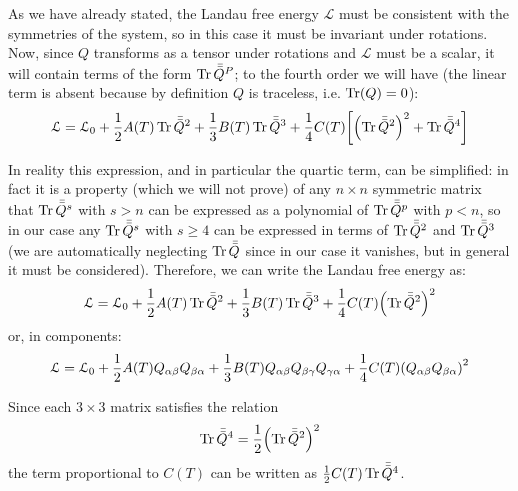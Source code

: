 \documentclass[../main/main.tex]{subfiles}
\begin{document}
As we have already stated, the Landau free energy \( \mathcal{L} \)  must be consistent with the symmetries of the system, so in this case it must be invariant under rotations. Now, since \( Q \) transforms as a tensor under rotations and \( \mathcal{L} \) must be a scalar, it will contain terms of the form  \( \Tr \bar{\bar{Q} }^P \); to the fourth order we will have (the linear term is absent because by definition \( Q \) is traceless, i.e. \( \Tr(Q) = 0  \)):
\begin{equation*}
  \mathcal{L} = \mathcal{L}_0 + \frac{1}{2} A(T) \Tr \bar{\bar{Q} }^2 + \frac{1}{3} B(T) \Tr \bar{\bar{Q} }^3 + \frac{1}{4} C(T) \qty[ \qty(\Tr \bar{\bar{Q} }^2  )^2 + \Tr \bar{\bar{Q} }^4 ]
\end{equation*}

In reality this expression, and in particular the quartic term, can be simplified: in fact it is a property (which we will not prove) of any \( n \times n \)  symmetric matrix that \( \Tr \bar{\bar{Q} }^s \) with \( s>n \)  can be expressed as a
 polynomial of \( \Tr \bar{\bar{Q} }^p \) with \( p<n \), so in our case any \( \Tr \bar{\bar{Q} }^s \) with \( s\geq 4 \) can be expressed in terms of \( \Tr \bar{\bar{Q} }^2 \) and \( \Tr \bar{\bar{Q} }^3 \) (we are automatically neglecting  \( \Tr \bar{\bar{Q} } \)  since in our case it vanishes, but in general it must be considered).
 Therefore, we can write the Landau free energy as:
 \begin{equation}
   \mathcal{L} = \mathcal{L}_0 + \frac{1}{2} A(T) \Tr \bar{\bar{Q} }^2 + \frac{1}{3} B(T) \Tr \bar{\bar{Q} }^3 + \frac{1}{4} C(T)  \qty(\Tr \bar{\bar{Q} }^2  )^2
 \end{equation}
or, in components:
\begin{equation}
  \mathcal{L} = \mathcal{L}_0 + \frac{1}{2} A(T) Q_{\alpha \beta }Q_{\beta \alpha } + \frac{1}{3} B(T) Q_{\alpha \beta } Q_{\beta \gamma  } Q_{\gamma  \alpha }+ \frac{1}{4} C(T) \qty(Q_{\alpha \beta } Q_{\beta  \alpha })^2
\end{equation}

\begin{remark}
Since each \( 3 \times 3 \) matrix satisfies the relation
\begin{equation*}
   \Tr \bar{\bar{Q} }^4 = \frac{1}{2} \qty( \Tr \bar{\bar{Q} }^2)^2
\end{equation*}
the term proportional to \( C(T) \) can be written as \( \frac{1}{2}C(T)  \Tr \bar{\bar{Q} }^4 \).
\end{remark}
\end{document}
